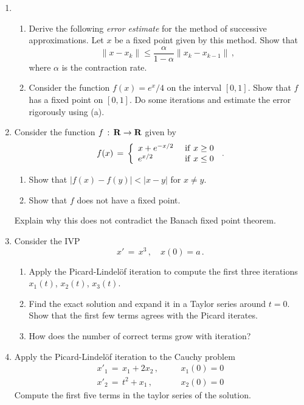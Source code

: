 \documentclass[12pt]{report}
\newcommand{\bR}{{\bf R}}
\def\to{\rightarrow}
\begin{document}
\begin{enumerate}
\item
\begin{enumerate}
\item Derive the following {\em error estimate} for the method of
successive approximations. Let $x$ be a fixed point given by this
method. Show that
\begin{equation}
\|x -x_k\| \le \frac{\alpha}{1-\alpha} \|x_k - x_{k-1}\| \,,
\end{equation}
where $\alpha$ is the contraction rate. 
\item Consider the function $f(x)= e^x/4$ on the interval
$[0,1]$. Show that $f$ has a fixed point on $[0,1]$. Do some
iterations and estimate the error rigorously using (a).
\end{enumerate}

\item Consider the function $f\,:\, \bR \to \bR$ given by 
\begin{equation}
f(x) \,=\, \left\{ \begin{array} {ll} x + e^{-x/2} & {\rm~if~} x \ge 0
\\ e^{x/2} & {\rm~if~} x \le 0 \end{array} \right. \,.
\end{equation}
\begin{enumerate} 
\item Show that $|f(x)-f(y)| < |x-y|$ for $x \not= y$. 
\item Show that $f$ does not have a fixed point. 
\end{enumerate}
Explain why this does not contradict the Banach fixed point theorem.

\item Consider the IVP
\begin{equation}
x' \,=\, x^3\,, \quad x(0)=a\,.
\end{equation}
\begin{enumerate}
\item
Apply the Picard-Lindel\"of iteration to 
compute the first three iterations $x_1(t)$, $x_2(t)$, $x_3(t)$. 
\item Find the exact solution and expand it in a Taylor series around $t=0$. 
Show that the first few terms agrees with the Picard iterates. 
\item How does the number of correct terms grow with iteration? 
\end{enumerate}

\item Apply the Picard-Lindel\"of iteration to the Cauchy problem
\begin{eqnarray}
x'_1\,=\, x_1 + 2x_2\,, & \quad & x_1(0)=0 \\
x'_2\,=\, t^2 + x_1\,, & \quad & x_2(0)=0 
\end{eqnarray}
Compute the first five terms in the taylor series of the solution. 




\end{enumerate}
\end{document}
